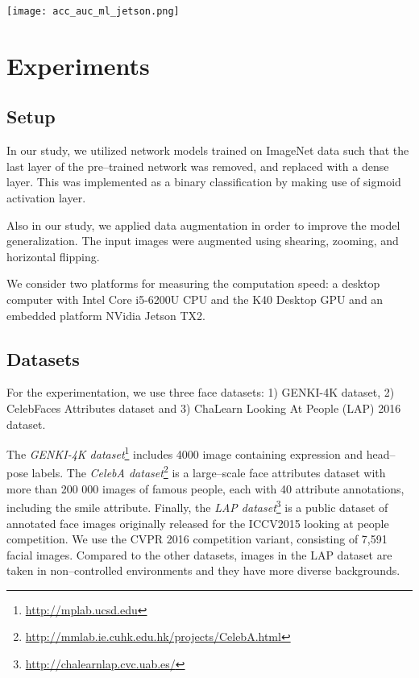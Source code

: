 \documentclass[conference]{IEEEtran}
\begin{document}
\begin{figure*}
\centering
\texttt{[image: acc\_auc\_ml\_jetson.png]}
\label{fig:accuracies}
\end{figure*}

\section{Experiments}

\subsection{Setup}

In our study, we utilized network models trained on ImageNet data such that the last layer of the pre--trained network was removed, and replaced with a dense layer. This was implemented as a binary classification by making use of sigmoid activation layer. %

Also in our study, we applied data augmentation in order to improve the  model generalization. The input images were augmented using shearing, zooming, and  horizontal flipping.

We consider two platforms for measuring the computation speed: a desktop computer with Intel Core i5-6200U CPU and the K40 Desktop GPU and an embedded platform NVidia Jetson TX2.

\subsection{Datasets}

For the experimentation, we use three face datasets: 1) GENKI-4K dataset, 2) CelebFaces Attributes dataset and 3) ChaLearn Looking At People (LAP) 2016 dataset.

The \textit{GENKI-4K dataset}\footnote{\url{http://mplab.ucsd.edu}} includes 4000 image containing expression and head--pose labels. The \textit{CelebA dataset}\footnote{\url{http://mmlab.ie.cuhk.edu.hk/projects/CelebA.html}} is a large--scale face attributes dataset with more than 200 000 images of famous people, each with 40 attribute annotations, including the smile attribute.  
Finally, the \textit{LAP dataset}\footnote{\url{http://chalearnlap.cvc.uab.es/}} is a public dataset of annotated face images originally released for the ICCV2015 looking at people competition. We use the CVPR 2016 competition variant, consisting of 7,591 facial images. Compared to the other datasets, images in the LAP dataset are taken in non--controlled environments and they have more diverse backgrounds. 
\end{document}
